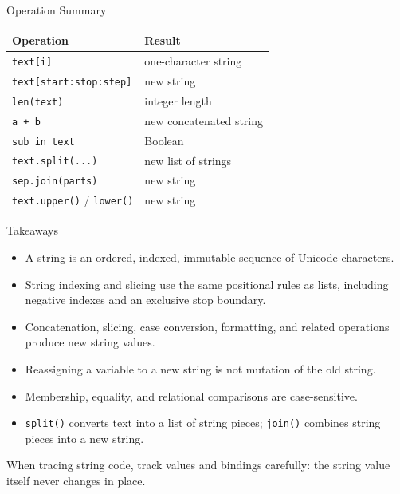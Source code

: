 \documentclass[aspectratio=169,10pt]{beamer}
\begin{document}
\begin{frame}{Operation Summary}
  \begin{center}
    \renewcommand{\arraystretch}{1.25}
    \begin{tabular}{l|l}
      \textbf{Operation} & \textbf{Result} \\\hline
      \texttt{text[i]} & one-character string \\
      \texttt{text[start:stop:step]} & new string \\
      \texttt{len(text)} & integer length \\
      \texttt{a + b} & new concatenated string \\
      \texttt{sub in text} & Boolean \\
      \texttt{text.split(...)} & new list of strings \\
      \texttt{sep.join(parts)} & new string \\
      \texttt{text.upper()} / \texttt{lower()} & new string
    \end{tabular}
  \end{center}
\end{frame}

\begin{frame}{Takeaways}
  \begin{itemize}
    \item A string is an ordered, indexed, immutable sequence of Unicode characters.
    \item String indexing and slicing use the same positional rules as lists, including negative indexes and an exclusive stop boundary.
    \item Concatenation, slicing, case conversion, formatting, and related operations produce new string values.
    \item Reassigning a variable to a new string is not mutation of the old string.
    \item Membership, equality, and relational comparisons are case-sensitive.
    \item \texttt{split()} converts text into a list of string pieces; \texttt{join()} combines string pieces into a new string.
  \end{itemize}

  \begin{keyidea}
    When tracing string code, track values and bindings carefully: the string value itself never changes in place.
  \end{keyidea}
\end{frame}
\end{document}
